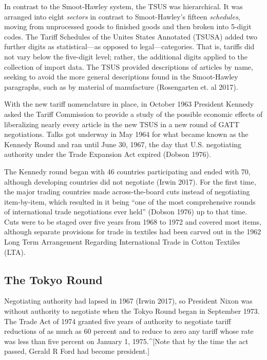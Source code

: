 \documentclass[
  12pt,
]{article}
\begin{document}
In contrast to the Smoot-Hawley system, the TSUS was hierarchical. It was arranged into eight \emph{sectors} in contrast to Smoot-Hawley's fifteen \emph{schedules}, moving from unprocessed goods to finished goods and then broken into 5-digit codes. The Tariff Schedules of the Unites States Annotated (TSUSA) added two further digits as statistical---as opposed to legal---categories. That is, tariffs did not vary below the five-digit level; rather, the additional digits applied to the collection of import data. The TSUS provided descriptions of articles by name, seeking to avoid the more general descriptions found in the Smoot-Hawley paragraphs, such as by material of manufacture (Rosengarten et. al 2017).

With the new tariff nomenclature in place, in October 1963 President Kennedy asked the Tariff Commission to provide a study of the possible economic effects of liberalizing nearly every article in the new TSUS in a new round of GATT negotiations. Talks got underway in May 1964 for what became known as the Kennedy Round and ran until June 30, 1967, the day that U.S. negotiating authority under the Trade Expansion Act expired (Dobson 1976).

The Kennedy round began with 46 countries participating and ended with 70, although developing countries did not negotiate (Irwin 2017). For the first time, the major trading countries made across-the-board cuts instead of negotiating item-by-item, which resulted in it being ``one of the most comprehensive rounds of international trade negotiations ever held'' (Dobson 1976) up to that time. Cuts were to be staged over five years from 1968 to 1972 and covered most items, although separate provisions for trade in textiles had been carved out in the 1962 Long Term Arrangement Regarding International Trade in Cotton Textiles (LTA).

\hypertarget{the-tokyo-round}{%
\subsection{The Tokyo Round}\label{the-tokyo-round}}

Negotiating authority had lapsed in 1967 (Irwin 2017), so President Nixon was without authority to negotiate when the Tokyo Round began in September 1973. The Trade Act of 1974 granted five years of authority to negotiate tariff reductions of as much as 60 percent and to reduce to zero any tariff whose rate was less than five percent on January 1, 1975.\^{}{[}Note that by the time the act passed, Gerald R Ford had become president.{]}
\end{document}
